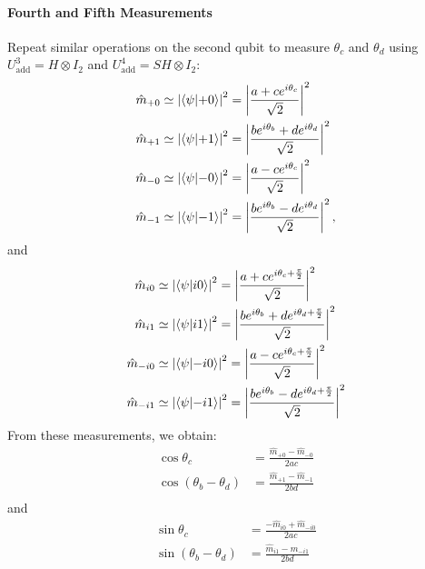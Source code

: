 \documentclass[a4paper, 11pt]{article}
\begin{document}
\paragraph{Fourth and Fifth Measurements}
Repeat similar operations on the second qubit to measure $\theta_c$ and $\theta_d$ using $U_{\text{add}}^{3} = H \otimes I_2$ and $U_{\text{add}}^{4} = SH \otimes I_2$:
\begin{align}
  \hat{m}_{+0} &\simeq \left| \bra{\psi}\ket{+0} \right|^2 = \left| \frac{a+c e^{i\theta_c}}{\sqrt{2}}\right|^2 \\ 
  \hat{m}_{+1} &\simeq \left| \bra{\psi}\ket{+1} \right|^2 = \left| \frac{b e^{i\theta_b} +d e^{i\theta_d}}{\sqrt{2}}\right|^2\\ 
  \hat{m}_{-0} &\simeq \left| \bra{\psi}\ket{-0} \right|^2 = \left| \frac{a-c e^{i\theta_c}}{\sqrt{2}}\right|^2  \\ 
  \hat{m}_{-1} &\simeq \left| \bra{\psi}\ket{-1} \right|^2 = \left| \frac{b e^{i\theta_b} -d e^{i\theta_d}}{\sqrt{2}}\right|^2, 
\end{align}
and
\begin{align}
  \hat{m}_{i0} &\simeq \left| \bra{\psi}\ket{i0} \right|^2   = \left| \frac{a+c e^{i\theta_c + \frac{\pi}{2}}}{\sqrt{2}}\right|^2 \\ 
  \hat{m}_{i1} &\simeq \left| \bra{\psi}\ket{i1} \right|^2   = \left| \frac{b e^{i\theta_b} +d e^{i\theta_d + \frac{\pi}{2}}}{\sqrt{2}}\right|^2 \\ 
  \hat{m}_{-i0} &\simeq \left| \bra{\psi}\ket{-i0} \right|^2 = \left| \frac{a-c e^{i\theta_c + \frac{\pi}{2}}}{\sqrt{2}}\right|^2 \\ 
  \hat{m}_{-i1} &\simeq \left| \bra{\psi}\ket{-i1} \right|^2 = \left| \frac{b e^{i\theta_b} -d e^{i\theta_d + \frac{\pi}{2}}}{\sqrt{2}}\right|^2
\end{align}
From these measurements, we obtain:
\begin{align}
  \cos\theta_{c} &= \frac{\hat{m}_{+0} - \hat{m}_{-0}}{2ac} \label{eq:TwoQubitQST5} \\
  \cos(\theta_{b} - \theta_{d}) &= \frac{\hat{m}_{+1} - \hat{m}_{-1}}{2bd} \label{eq:TwoQubitQST6} \\
\end{align}
and
\begin{align}
  \sin\theta_{c} &= \frac{ - \hat{m}_{i0} + \hat{m}_{-i 0}}{2ac} \label{eq:TwoQubitQST7} \\
  \sin(\theta_{b} - \theta_{d}) &= \frac{\hat{m}_{i1} - \hat{m}_{-i1}}{2bd} \label{eq:TwoQubitQST8} \\
\end{align}
\end{document}
